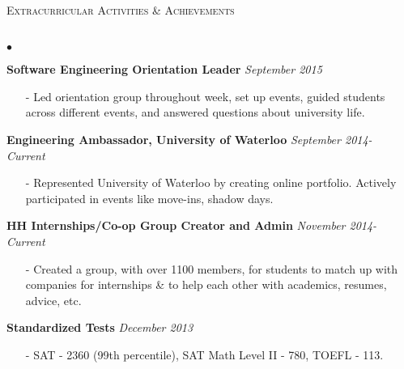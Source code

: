 \documentclass[10pt]{article}
\newcommand{\lineunder}{\vspace*{-8pt} \\ \hspace*{-18pt} \hrulefill \\}
\newcommand{\header}[1]{{\hspace*{-15pt}\vspace*{6pt} \textsc{#1}} \vspace*{-6pt} \lineunder }
\newenvironment{achievements}{\begin{list}{$\bullet$}{\topsep 0pt \itemsep -1.5pt \leftmargin 5pt}}{\vspace*{4pt}\end{list}}
\begin{document}
\header{\fontsize{11}{12}\selectfont Extracurricular Activities \& Achievements}
\begin{achievements}
\item \textbf{Software Engineering Orientation Leader} \hfill \textit {September 2015}
\begin{itemize}
\item[-] Led orientation group throughout week, set up events, guided students across different events, and answered questions about university life.
\end{itemize}
\vspace{2pt}
\item \textbf{Engineering Ambassador, University of Waterloo} \hfill \textit {September 2014- Current}
\begin{itemize}
\item[-] Represented University of Waterloo by creating online portfolio. Actively participated in events like move-ins, shadow days.
\end{itemize}
\vspace{2pt}
\item \textbf{HH Internships/Co-op Group Creator and Admin} \hfill \textit {November 2014- Current}
\begin{itemize}
\item[-]Created a group, with over 1100 members, for students to match up with companies for internships \& to help each other with academics, resumes, advice, etc.
\end{itemize}
\vspace{2pt}
\item \textbf{Standardized Tests} \hfill \textit {December 2013}
\begin{itemize}
\item[-]SAT - 2360 (99th percentile), SAT Math Level II - 780, TOEFL - 113.
\end{itemize}
\end{achievements}
\end{document}
